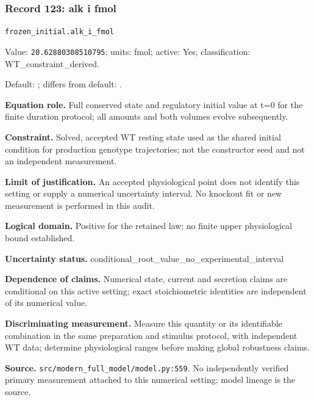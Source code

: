 \subsubsection*{Record 123: alk i fmol}
{\small \nolinkurl{frozen_initial.alk_i_fmol}\par

Value: \texttt{20.62880308510795}; units: fmol; active: Yes; classification: WT\_constraint\_derived.\par

Default: ; differs from default: .\par

\textbf{Equation role.} Full conserved state and regulatory initial value at t=0 for the finite duration protocol; all amounts and both volumes evolve subsequently.\par

\textbf{Constraint.} Solved, accepted WT resting state used as the shared initial condition for production genotype trajectories; not the constructor seed and not an independent measurement.\par

\textbf{Limit of justification.} An accepted physiological point does not identify this setting or supply a numerical uncertainty interval. No knockout fit or new measurement is performed in this audit.\par

\textbf{Logical domain.} Positive for the retained law; no finite upper physiological bound established.\par

\textbf{Uncertainty status.} conditional\_root\_value\_no\_experimental\_interval\par

\textbf{Dependence of claims.} Numerical state, current and secretion claims are conditional on this active setting; exact stoichiometric identities are independent of its numerical value.\par

\textbf{Discriminating measurement.} Measure this quantity or its identifiable combination in the same preparation and stimulus protocol, with independent WT data; determine physiological ranges before making global robustness claims.\par

\textbf{Source.} \nolinkurl{src/modern_full_model/model.py:559}. No independently verified primary measurement attached to this numerical setting; model lineage is the source.\par}

